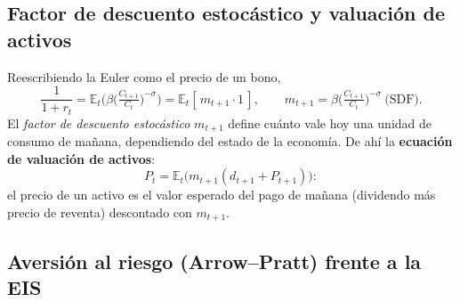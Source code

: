 \documentclass[11pt]{article}
\theoremstyle{definition}
\newcommand{\E}{\mathbb{E}}
\begin{document}
\subsection{Factor de descuento estocástico y valuación de activos}

Reescribiendo la Euler como el precio de un bono,
\begin{equation}
\frac{1}{1+r_{t}}=\E_{t}\!\Big(\beta\Big(\tfrac{C_{t+1}}{C_{t}}\Big)^{-\sigma}\Big)=\E_{t}[\,m_{t+1}\cdot1\,],
\qquad
m_{t+1}=\beta\Big(\tfrac{C_{t+1}}{C_{t}}\Big)^{-\sigma}\ \text{(SDF).}
\end{equation}
El \emph{factor de descuento estocástico} $m_{t+1}$ define cuánto vale hoy una unidad de consumo de
mañana, dependiendo del estado de la economía. De ahí la \textbf{ecuación de valuación de activos}:
\begin{equation}
P_{t}=\E_{t}\big(m_{t+1}(d_{t+1}+P_{t+1})\big):
\end{equation}
el precio de un activo es el valor esperado del pago de mañana (dividendo más precio de reventa)
descontado con $m_{t+1}$.

\subsection{Aversión al riesgo (Arrow--Pratt) frente a la EIS}
\end{document}
